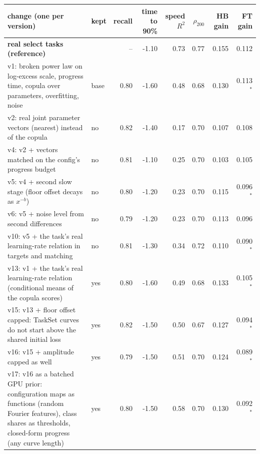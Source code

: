 \begin{tabular}{p{6.2cm}lrrrrrr}
\toprule
change (one per version) & kept & recall & time to 90\% & speed $R^2$ & $\rho_{200}$ & HB gain & FT gain \\
\midrule
\textbf{real select tasks (reference)} & & -- & -1.10 & 0.73 & 0.77 & 0.155 & 0.112 \\
\midrule
v1: broken power law on log-excess scale, progress time, copula over parameters, overfitting, noise & base & 0.80 & -1.60 & 0.48 & 0.68 & 0.130 & 0.113$^*$ \\
v2: real joint parameter vectors (nearest) instead of the copula & no & 0.82 & -1.40 & 0.17 & 0.70 & 0.107 & 0.108 \\
v4: v2 + vectors matched on the config's progress budget & no & 0.81 & -1.10 & 0.25 & 0.70 & 0.103 & 0.105 \\
v5: v4 + second slow stage (floor offset decays as $x^{-b}$) & no & 0.80 & -1.20 & 0.23 & 0.70 & 0.115 & 0.096$^*$ \\
v6: v5 + noise level from second differences & no & 0.79 & -1.20 & 0.23 & 0.70 & 0.113 & 0.096 \\
v10: v5 + the task's real learning-rate relation in targets and matching & no & 0.81 & -1.30 & 0.34 & 0.72 & 0.110 & 0.090$^*$ \\
v13: v1 + the task's real learning-rate relation (conditional means of the copula scores) & yes & 0.80 & -1.60 & 0.49 & 0.68 & 0.133 & 0.105$^*$ \\
v15: v13 + floor offset capped: TaskSet curves do not start above the shared initial loss & yes & 0.82 & -1.50 & 0.50 & 0.67 & 0.127 & 0.094$^*$ \\
v16: v15 + amplitude capped as well & yes & 0.79 & -1.50 & 0.51 & 0.70 & 0.124 & 0.089$^*$ \\
v17: v16 as a batched GPU prior: configuration maps as functions (random Fourier features), class shares as thresholds, closed-form progress (any curve length) & yes & 0.80 & -1.50 & 0.58 & 0.70 & 0.130 & 0.092$^*$ \\
\bottomrule
\end{tabular}
